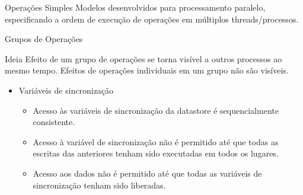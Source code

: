 %
%
%
%
%
%

\begin{frame}{Operações Simples}
Modelos desenvolvidos para processamento paralelo, especificando a ordem de execução de operações em múltiplos threads/processos.
\end{frame}


\begin{frame}{Grupos de Operações}
\begin{block}{Ideia}
Efeito de um grupo de operações se torna visível a outros processos ao mesmo tempo. 
Efeitos de operações individuais em um grupo não são visíveis.
\end{block}

\begin{itemize}
	\item Variáveis de sincronização
	\begin{itemize}
		\item Acesso às variáveis de sincronização da datastore é sequencialmente consistente.
		\item Acesso à variável de sincronização não é permitido até que todas as escritas das anteriores tenham sido executadas em todos os lugares.
		\item Acesso aos dados não é permitido até que todas as variáveis de sincronização tenham sido liberadas.
	\end{itemize}
\end{itemize}

\end{frame}

